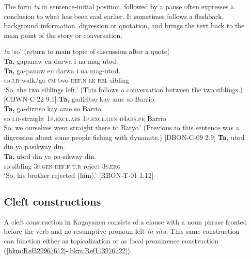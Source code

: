 The form \textit{ta} in sentence-initial position, followed by a pause often expresses a conclusion to what has been said earlier. It sometimes follows a flashback, background information, digression or quotation, and brings the text back to the main point of the story or conversation.

\ea 
\label{bkm:Ref445900445}
\textit{ta} ‘so’ (return to main topic of discussion after a quote) \\
\textbf{Ta,}  gapanaw  en  darwa  i  na  mag-utod. \\\smallskip
\gll \textbf{Ta,}  ga-panaw  en  darwa  i  na  mag-utod. \\
so  \textsc{i.r}-walk/go \textsc{cm}  two  \textsc{def.n}  \textsc{lk}  \textsc{rel-}sibling \\
\glt ‘So, the two siblings left.’  (This follows a conversation between the  two siblings.) [CBWN-C-22 9.1]
\z
\ea
\textbf{Ta,}  gadiritso  kay  ame  so  Barrio. \\\smallskip
\gll \textbf{Ta,}  ga-diritso  kay  ame  so  Barrio \\
so  \textsc{i.r}-straight  1\textsc{p.excl.abs} 1\textsc{p.excl.gen} \textsc{d4abs.pr} Barrio \\
\glt So, we ourselves went  straight there to Baryo.’ (Previous to  this sentence was a digression about  some people fishing with dynamite.) [DBON-C-09 2.9] 
\z
\ea
\textbf{Ta},  utod  din  ya  pasikway  din. \\\smallskip
\gll \textbf{Ta},  utod  din  ya  pa-sikway  din. \\
so  sibling  3\textsc{s.gen}  \textsc{def.f}  \textsc{t.r}-reject  3\textsc{s.erg} \\
\glt ‘So, his brother rejected (him).’ [RBON-T-01 1.12]
\z

\subsection{Cleft constructions}
\label{bkm:Ref122603009}\label{sec:cleftconstructions}

A cleft construction in Kagayanen consists of a clause with a noun phrase fronted before the verb and no resumptive pronoun left \textit{in situ}. This same construction can function either as topicalization or as focal prominence construction (\ref{bkm:Ref329967612}-\ref{bkm:Ref113976722}).

